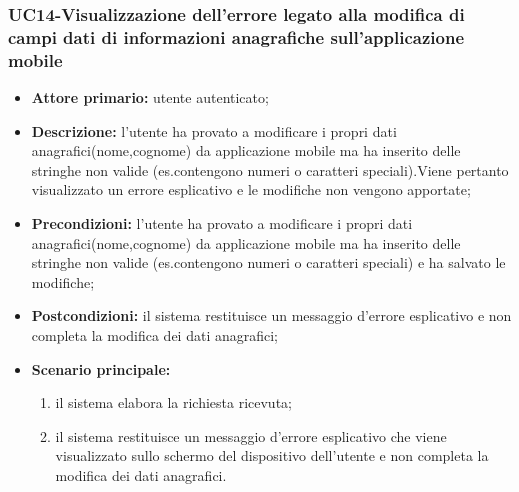 \subsubsection{UC14-Visualizzazione dell'errore legato alla modifica di campi dati di informazioni anagrafiche sull'applicazione mobile}
\begin{itemize}
	\item \textbf{Attore primario:} utente autenticato;

	\item \textbf{Descrizione:} l'utente ha provato a modificare i propri dati anagrafici(nome,cognome) da applicazione mobile ma ha inserito delle stringhe non valide (es.contengono numeri o caratteri speciali).Viene pertanto visualizzato un errore esplicativo e le modifiche non vengono apportate;

	\item \textbf{Precondizioni:} l'utente ha provato a modificare i propri dati anagrafici(nome,cognome) da applicazione mobile ma ha inserito delle stringhe non valide (es.contengono numeri o caratteri speciali) e ha salvato le modifiche;

	\item \textbf{Postcondizioni:} il sistema restituisce un messaggio d'errore esplicativo e non completa la modifica dei dati anagrafici;

	\item \textbf{Scenario principale:}
	
		\begin{enumerate}
   			 \item il sistema elabora la richiesta ricevuta;
    		 \item il sistema restituisce un messaggio d'errore esplicativo che viene visualizzato sullo schermo del dispositivo dell'utente e non completa la modifica dei dati anagrafici.
		\end{enumerate}
\end{itemize}


